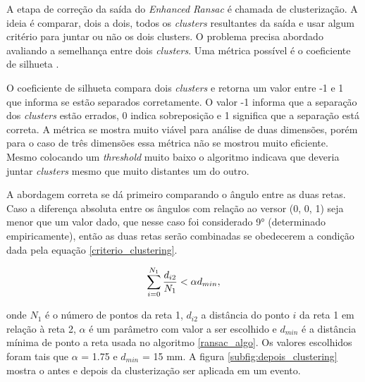 \documentclass[a4paper,12pt,oneside]{book}
\begin{document}
\par A etapa de correção da saída do \textit{Enhanced Ransac} é chamada de clusterização. A ideia é comparar, dois a dois, todos os \textit{clusters} resultantes da saída e usar algum critério para juntar ou não os dois clusters. O problema precisa abordado avaliando a semelhança entre dois \textit{clusters}. Uma métrica possível é o coeficiente de silhueta \cite{silhueta}.

\par O coeficiente de silhueta compara dois \textit{clusters} e retorna um valor entre -1 e 1 que informa se estão separados corretamente. O valor -1 informa que a separação dos \textit{clusters} estão errados, 0 indica sobreposição e 1 significa que a separação está correta. A métrica se mostra muito viável para análise de duas dimensões, porém para o caso de três dimensões essa métrica não se mostrou muito eficiente. Mesmo colocando um \textit{threshold} muito baixo o algoritmo indicava que deveria juntar \textit{clusters} mesmo que muito distantes um do outro.

\par A abordagem correta se dá primeiro comparando o ângulo entre as duas retas. Caso a diferença absoluta entre os ângulos com relação ao versor (0, 0, 1) seja menor que um valor dado, que nesse caso foi considerado 9° (determinado empiricamente), então as duas retas serão combinadas se obedecerem a condição dada pela equação \ref{criterio_clustering}.

\begin{equation}\label{criterio_clustering}
    \sum_{i = 0}^{N_1}\frac{d_{i2}}{N_1} < \alpha \space d_{min}, 
\end{equation}

onde $N_1$ é o número de pontos da reta 1, $d_{i2}$ a distância do ponto $i$ da reta 1 em relação à reta 2, $\alpha$ é um parâmetro com valor a ser escolhido e $d_{min}$ é a distância mínima de ponto a reta usada no algoritmo \ref{ransac_algo}. Os valores escolhidos foram tais que $\alpha$ = 1.75 e $d_{min}$ = 15 mm. A figura \ref{subfig:depois_clustering} mostra o antes e depois da clusterização ser aplicada em um evento.


\end{document}
